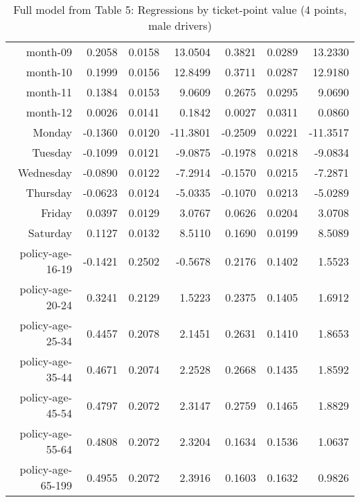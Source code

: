 \documentclass[10pt]{article}
\begin{document}
\begin{table}[ht]
\begin{tabular}{rrrrrrr}
  month-09 & 0.2058 & 0.0158 & 13.0504 & 0.3821 & 0.0289 & 13.2330 \\ 
  month-10 & 0.1999 & 0.0156 & 12.8499 & 0.3711 & 0.0287 & 12.9180 \\ 
  month-11 & 0.1384 & 0.0153 & 9.0609 & 0.2675 & 0.0295 & 9.0690 \\ 
  month-12 & 0.0026 & 0.0141 & 0.1842 & 0.0027 & 0.0311 & 0.0860 \\ 
  Monday & -0.1360 & 0.0120 & -11.3801 & -0.2509 & 0.0221 & -11.3517 \\ 
  Tuesday & -0.1099 & 0.0121 & -9.0875 & -0.1978 & 0.0218 & -9.0834 \\ 
  Wednesday & -0.0890 & 0.0122 & -7.2914 & -0.1570 & 0.0215 & -7.2871 \\ 
  Thursday & -0.0623 & 0.0124 & -5.0335 & -0.1070 & 0.0213 & -5.0289 \\ 
  Friday & 0.0397 & 0.0129 & 3.0767 & 0.0626 & 0.0204 & 3.0708 \\ 
  Saturday & 0.1127 & 0.0132 & 8.5110 & 0.1690 & 0.0199 & 8.5089 \\ 
  policy-age-16-19 & -0.1421 & 0.2502 & -0.5678 & 0.2176 & 0.1402 & 1.5523 \\ 
  policy-age-20-24 & 0.3241 & 0.2129 & 1.5223 & 0.2375 & 0.1405 & 1.6912 \\ 
  policy-age-25-34 & 0.4457 & 0.2078 & 2.1451 & 0.2631 & 0.1410 & 1.8653 \\ 
  policy-age-35-44 & 0.4671 & 0.2074 & 2.2528 & 0.2668 & 0.1435 & 1.8592 \\ 
  policy-age-45-54 & 0.4797 & 0.2072 & 2.3147 & 0.2759 & 0.1465 & 1.8829 \\ 
  policy-age-55-64 & 0.4808 & 0.2072 & 2.3204 & 0.1634 & 0.1536 & 1.0637 \\ 
  policy-age-65-199 & 0.4955 & 0.2072 & 2.3916 & 0.1603 & 0.1632 & 0.9826 \\ 
   \hline
\end{tabular}
\caption{Full model from Table 5: Regressions by ticket-point value (4 points, male drivers)} 
\label{tab_5_4_pts_M}
\end{table}


\clearpage
\pagebreak



\end{document}
